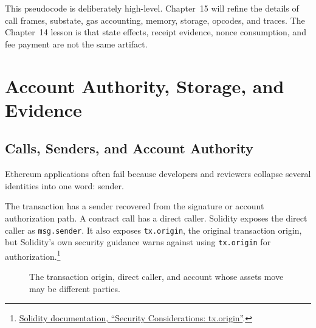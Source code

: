This pseudocode is deliberately high-level. Chapter~15 will refine the details of call frames, substate, gas accounting, memory, storage, opcodes, and traces. The Chapter~14 lesson is that state effects, receipt evidence, nonce consumption, and fee payment are not the same artifact.

\section{Account Authority, Storage, and Evidence}

\subsection{Calls, Senders, and Account Authority}

Ethereum applications often fail because developers and reviewers collapse several identities into one word: sender.

The transaction has a sender recovered from the signature or account authorization path. A contract call has a direct caller. Solidity exposes the direct caller as \texttt{msg.sender}. It also exposes \texttt{tx.origin}, the original transaction origin, but Solidity's own security guidance warns against using \texttt{tx.origin} for authorization.\footnote{\href{https://docs.soliditylang.org/en/latest/security-considerations.html\#tx-origin}{Solidity documentation, ``Security Considerations: tx.origin''}.}

\begin{figure}[htbp]
\centering
{}
\caption{The transaction origin, direct caller, and account whose assets move may be different parties.}
\end{figure}

